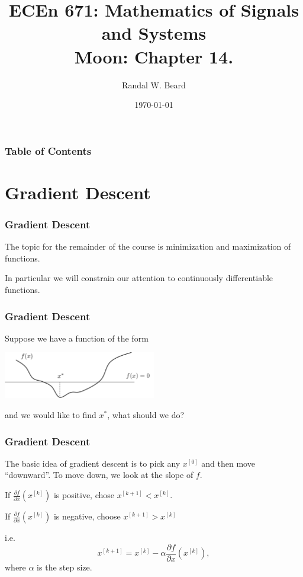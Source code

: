 \documentclass{beamer}
\title{ECEn 671: Mathematics of Signals and Systems \\ 
Moon: Chapter 14.}
\author{Randal W. Beard}
\institute{Brigham Young University}
\date{\today}
\begin{document}
\begin{frame}
	\titlepage
\end{frame}

\begin{frame}[t]
\frametitle{Table of Contents}
\tableofcontents
\end{frame}

\section{Gradient Descent}
\frame{\sectionpage}


\begin{frame}\frametitle{Gradient Descent}
	The topic for the remainder of the course is minimization and maximization of functions.
	
	\vfill
	
	In particular we will constrain our attention to continuously differentiable functions.
\end{frame}

\begin{frame}\frametitle{Gradient Descent}
	Suppose we have a function of the form
	\begin{center}
		\includegraphics[width=0.5\textwidth]
			{figures/chap14_function_with_minimum}
	\end{center}
	and we would like to find $x^{\ast}$, what should we do?
\end{frame}

\begin{frame}\frametitle{Gradient Descent}
	The basic idea of gradient descent is to pick any $x^{[0]}$ and then move ``downward''.  To move down, we look at the slope of $f$.
	
	\vfill
	
	If $\frac{\partial f}{\partial x}(x^{[k]})$ is positive, chose $x^{[k+1]} < x^{[k]}$.
	
	\vfill
	
	If $\frac{\partial f}{\partial x}(x^{[k]})$ is negative, choose $x^{[k+1]} > x^{[k]}$
	
	\vfill
	
	i.e.
	\[ 
		x^{[k+1]} = x^{[k]} - \alpha \frac{\partial f}{\partial x}(x^{[k]}),
	\]
	where $\alpha$ is the step size.	
\end{frame}
\end{document}
